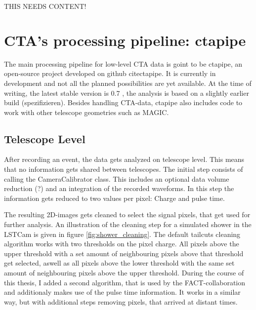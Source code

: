 THIS NEEDS CONTENT!


\section{CTA's processing pipeline: ctapipe}
The main processing pipeline for low-level  CTA data is goint to be ctapipe,
an open-source project developed on github cite{ctapipe}.
It is currently in development and not all the planned 
possibilities are yet available.
At the time of writing, the latest stable version is 0.7
\cite{karl_kosack_2019_3372211}, the analysis is based on a slightly earlier 
build (spezifizieren).
Besides handling CTA-data, ctapipe also includes code to work with
other telescope geometries such as MAGIC.

\subsection{Telescope Level}
After recording an event, the data gets analyzed on telescope level.
This means that no information gets shared between telescopes.
The initial step consists of calling the
CameraCalibrator class. This includes an optional
data volume reduction (?) and an integration of the recorded waveforms.
In this step the information gets reduced to two values per pixel:
Charge and pulse time.

The resulting 2D-images gets cleaned to select the signal pixels,
that get used for further analysis.
An illustration of the cleaning step 
for a simulated shower in the LSTCam is given in figure \ref{fig:shower_cleaning}.
The default tailcuts cleaning algorithm works with two thresholds on the 
pixel charge. All pixels above the upper threshold with a set amount of neighbouring 
pixels above that threshold get selected, aswell as 
all pixels above the lower threshold with the same set amount of neighbouring pixels
above the upper threshold.
During the course of this thesis, I added a second algorithm, that is used by the FACT-collaboration 
and additionaly makes use of the pulse time information.
It works in a similar way, but with additional steps removing pixels, that arrived
at distant times.

